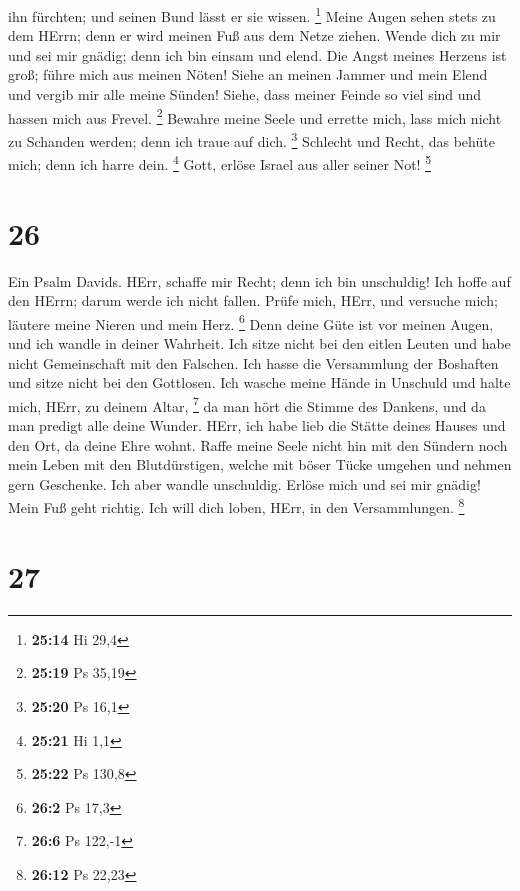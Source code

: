 ihn fürchten; und seinen Bund lässt er sie wissen. \footnote{\textbf{25:14}
  Hi 29,4}  Meine Augen sehen stets zu dem HErrn; denn er
wird meinen Fuß aus dem Netze ziehen.  Wende dich zu mir
und sei mir gnädig; denn ich bin einsam und elend.  Die
Angst meines Herzens ist groß; führe mich aus meinen Nöten!
 Siehe an meinen Jammer und mein Elend und vergib mir alle
meine Sünden!  Siehe, dass meiner Feinde so viel sind und
hassen mich aus Frevel. \footnote{\textbf{25:19} Ps 35,19} 
Bewahre meine Seele und errette mich, lass mich nicht zu Schanden
werden; denn ich traue auf dich. \footnote{\textbf{25:20} Ps 16,1}
 Schlecht und Recht, das behüte mich; denn ich harre dein.
\footnote{\textbf{25:21} Hi 1,1}  Gott, erlöse Israel aus
aller seiner Not! \footnote{\textbf{25:22} Ps 130,8}

\hypertarget{section-11}{%
\section{26}\label{section-11}}

 Ein Psalm Davids. HErr, schaffe mir Recht; denn ich bin
unschuldig! Ich hoffe auf den HErrn; darum werde ich nicht fallen.
 Prüfe mich, HErr, und versuche mich; läutere meine Nieren
und mein Herz. \footnote{\textbf{26:2} Ps 17,3}  Denn deine
Güte ist vor meinen Augen, und ich wandle in deiner Wahrheit.
 Ich sitze nicht bei den eitlen Leuten und habe nicht
Gemeinschaft mit den Falschen.  Ich hasse die Versammlung
der Boshaften und sitze nicht bei den Gottlosen.  Ich wasche
meine Hände in Unschuld und halte mich, HErr, zu deinem Altar,
\footnote{\textbf{26:6} Ps 122,-1}  da man hört die Stimme
des Dankens, und da man predigt alle deine Wunder.  HErr,
ich habe lieb die Stätte deines Hauses und den Ort, da deine Ehre wohnt.
 Raffe meine Seele nicht hin mit den Sündern noch mein Leben
mit den Blutdürstigen,  welche mit böser Tücke umgehen und
nehmen gern Geschenke.  Ich aber wandle unschuldig. Erlöse
mich und sei mir gnädig!  Mein Fuß geht richtig. Ich will
dich loben, HErr, in den Versammlungen. \footnote{\textbf{26:12} Ps
  22,23}

\hypertarget{section-12}{%
\section{27}\label{section-12}}

